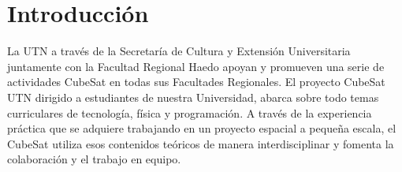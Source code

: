 \chapter{Introducción}
La UTN a través de la Secretaría de Cultura y Extensión Universitaria juntamente con la Facultad Regional Haedo apoyan y promueven una serie
de actividades CubeSat en todas sus Facultades Regionales. El proyecto CubeSat UTN dirigido a estudiantes de nuestra Universidad, abarca
sobre todo temas curriculares de tecnología, física y programación. A través de la experiencia práctica que se adquiere trabajando en un
proyecto espacial a pequeña escala, el CubeSat utiliza esos contenidos teóricos de manera interdisciplinar y fomenta la colaboración y el 
trabajo en equipo.